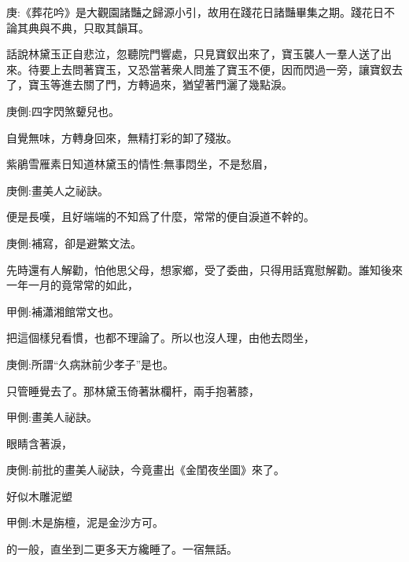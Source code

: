 
\begin{parag}
    \begin{note}庚:《葬花吟》是大觀園諸豔之歸源小引，故用在踐花日諸豔畢集之期。踐花日不論其典與不典，只取其韻耳。\end{note}
\end{parag}


\begin{parag}
    話說林黛玉正自悲泣，忽聽院門響處，只見寶釵出來了，寶玉襲人一羣人送了出來。待要上去問著寶玉，又恐當著衆人問羞了寶玉不便，因而閃過一旁，讓寶釵去了，寶玉等進去關了門，方轉過來，猶望著門灑了幾點淚。\begin{note}庚側:四字閃煞顰兒也。\end{note}自覺無味，方轉身回來，無精打彩的卸了殘妝。
\end{parag}


\begin{parag}
    紫鵑雪雁素日知道林黛玉的情性:無事悶坐，不是愁眉，\begin{note}庚側:畫美人之祕訣。\end{note}便是長嘆，且好端端的不知爲了什麼，常常的便自淚道不幹的。\begin{note}庚側:補寫，卻是避繁文法。\end{note}先時還有人解勸，怕他思父母，想家鄉，受了委曲，只得用話寬慰解勸。誰知後來一年一月的竟常常的如此，\begin{note}甲側:補瀟湘館常文也。\end{note}把這個樣兒看慣，也都不理論了。所以也沒人理，由他去悶坐，\begin{note}庚側:所謂“久病牀前少孝子”是也。\end{note}只管睡覺去了。那林黛玉倚著牀欄杆，兩手抱著膝，\begin{note}甲側:畫美人祕訣。\end{note}眼睛含著淚，\begin{note}庚側:前批的畫美人祕訣，今竟畫出《金閨夜坐圖》來了。\end{note}好似木雕泥塑\begin{note}甲側:木是旃檀，泥是金沙方可。\end{note}的一般，直坐到二更多天方纔睡了。一宿無話。
\end{parag}



